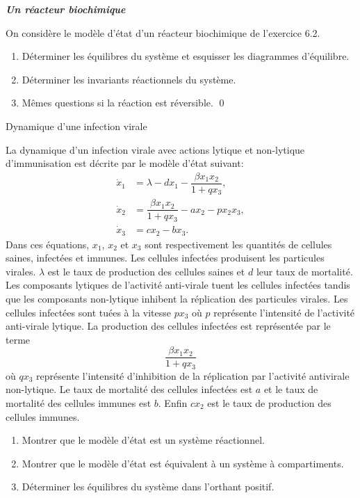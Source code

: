 \begin{exercice}{\bf \em Un r\'eacteur biochimique}

On consid\`ere le mod\`ele d'\'etat d'un r\'eacteur biochimique de l'exercice 6.2.
\begin{enumerate}
\item D\'eterminer les \'equilibres du syst\`eme et esquisser les diagrammes
d'\'equilibre.
\item D\'eterminer les invariants r\'eactionnels du syst\`eme.
\item Mêmes questions si la r\'eaction est r\'eversible. \qed
\end{enumerate}
\end{exercice}
\vv

\begin{exercice}{Dynamique d'une infection virale}

La dynamique d'un infection virale avec actions lytique et non-lytique d'immunisation est décrite par le modèle d'état suivant:
\begin{equation*} \begin{split}
\dot x_1 &= \lambda - dx_1 - \dfrac{\beta x_1 x_2}{1 + q x_3}, \\
\dot x_2 &= \dfrac{\beta x_1 x_2}{1 + q x_3} - a x_2 - p x_2 x_3, \\
\dot x_3 &= c x_2 - b x_3.
\end{split} \end{equation*}
Dans ces équations, $x_1$, $x_2$ et $x_3$ sont respectivement les quantités de cellules saines, infectées et immunes. Les cellules infectées produisent les particules virales. $\lambda$ est le taux de production des cellules saines et $d$ leur taux de mortalité. Les composants lytiques de l'activité anti-virale tuent les cellules infectées tandis que les composants non-lytique inhibent la réplication des particules virales. Les cellules infectées sont tuées  à la vitesse $p x_3$ où $p$ représente l'intensité de l'activité anti-virale lytique. La production des cellules infectées est représentée par le terme
$$
\dfrac{\beta x_1 x_2}{1 + q x_3}
$$
où $q x_3$ représente l'intensité d'inhibition de la réplication par l'activité antivirale non-lytique. Le taux de mortalité des cellules infectées est $a$ et le taux de mortalité des cellules immunes est $b$. Enfin $c x_2$ est le taux de production des cellules immunes.
\begin{enumerate}
\item Montrer que le modèle d'état est un système réactionnel.
\item Montrer que le modèle d'état est équivalent à un système à compartiments.
\item Déterminer les équilibres du système dans l'orthant positif.
\end{enumerate}
\end{exercice}
\vv


